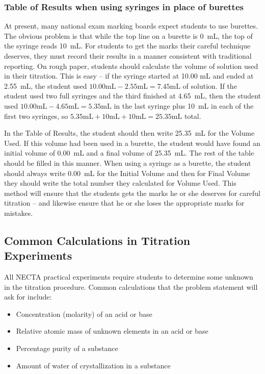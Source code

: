 \subsubsection{Table of Results when using syringes in place of burettes}

At present, many national exam marking boards expect students to use burettes. The obvious problem is that while the top line on a burette is 0~mL, the top of the syringe reads 10~mL. For students to get the marks their careful technique deserves, they must record their results in a manner consistent with traditional reporting. On rough paper, students should calculate the volume of solution used in their titration. This is easy -- if the syringe started at 10.00 mL and ended at 2.55~mL, the student used $10.00 \mathrm{mL} - 2.55 \mathrm{mL} = 7.45 \mathrm{mL}$ of solution. If the student used two full syringes and the third finished at 4.65~mL, then the student used $10.00 \mathrm{mL} - 4.65 \mathrm{mL} = 5.35 \mathrm{mL}$ in the last syringe plus 10~mL in each of the first two syringes, so $5.35 \mathrm{mL} + 10 \mathrm{mL} + 10 \mathrm{mL} = 25.35 \mathrm{mL}$ total.

In the Table of Results, the student should then write 25.35~mL for the Volume Used. If this volume had been used in a burette, the student would have found an initial volume of 0.00~mL and a final volume of 25.35~mL. The rest of the table should be filled in this manner. When using a syringe as a burette, the student should always write 0.00~mL for the Initial Volume and then for Final Volume they should write the total number they calculated for Volume Used. This method will ensure that the students gets the marks he or she deserves for careful titration – and likewise ensure that he or she loses the appropriate marks for mistakes.


\subsection{Common Calculations in Titration Experiments}
\label{sub:titcalc}

All NECTA practical experiments require students to determine some unknown in the titration procedure. Common calculations that the problem statement will ask for include:

\begin{itemize}

\item{Concentration (molarity) of an acid or base}
\item{Relative atomic mass of unknown elements in an acid or base}
\item{Percentage purity of a substance}
\item{Amount of water of crystallization in a substance}

\end{itemize}

